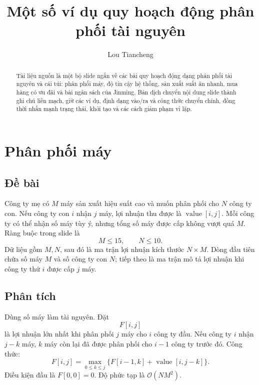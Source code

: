 \documentclass[11pt]{article}
\title{Một số ví dụ quy hoạch động phân phối tài nguyên}
\author{Lou Tiancheng}
\date{}
\newcommand{\Oh}{\mathcal{O}}
\begin{document}
\maketitle


\begin{abstract}
Tài liệu nguồn là một bộ slide ngắn về các bài quy hoạch động dạng phân phối
tài nguyên và cái túi: phân phối máy, độ tin cậy hệ thống, sản xuất suất ăn
nhanh, mua hàng có ưu đãi và bài ngân sách của Jinming. Bản dịch chuyển nội
dung slide thành ghi chú liền mạch, giữ các ví dụ, định dạng vào/ra và công
thức chuyển chính, đồng thời nhấn mạnh trạng thái, khởi tạo và các cách giảm
phạm vi lặp.
\end{abstract}

\tableofcontents

\section{Phân phối máy}

\subsection{Đề bài}

Công ty mẹ có \(M\) máy sản xuất hiệu suất cao và muốn phân phối cho \(N\)
công ty con. Nếu công ty con \(i\) nhận \(j\) máy, lợi nhuận thu được là
\(\operatorname{value}[i,j]\). Mỗi công ty có thể nhận số máy tùy ý, nhưng
tổng số máy được cấp không vượt quá \(M\). Ràng buộc trong slide là
\[
  M\le 15,\qquad N\le 10.
\]
Dữ liệu gồm \(M,N\), sau đó là ma trận lợi nhuận kích thước \(N\times M\).
Dòng đầu tiên chứa số máy \(M\) và số công ty con \(N\); tiếp theo là ma trận
mô tả lợi nhuận khi công ty thứ \(i\) được cấp \(j\) máy.

\subsection{Phân tích}

Dùng số máy làm tài nguyên. Đặt
\[
  F[i,j]
\]
là lợi nhuận lớn nhất khi phân phối \(j\) máy cho \(i\) công ty đầu. Nếu công
ty \(i\) nhận \(j-k\) máy, \(k\) máy còn lại đã được phân phối cho \(i-1\)
công ty trước đó. Công thức:
\[
  F[i,j]=\max_{0\le k\le j}
  \{F[i-1,k]+\operatorname{value}[i,j-k]\}.
\]
Điều kiện đầu là \(F[0,0]=0\). Độ phức tạp là \(\Oh(NM^2)\).
\end{document}
